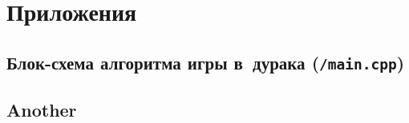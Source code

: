 \documentclass[a4paper,12pt]{article}
\begin{document}
    \section{Приложения}
    \hypertarget{rulesimg}{\subsection{Блок-схема алгоритма игры в~дурака (\texttt{/main.cpp})}}
    \begin{figure}[h!]
    \end{figure}
    \newpage
    \subsection{Another}
\end{document}
